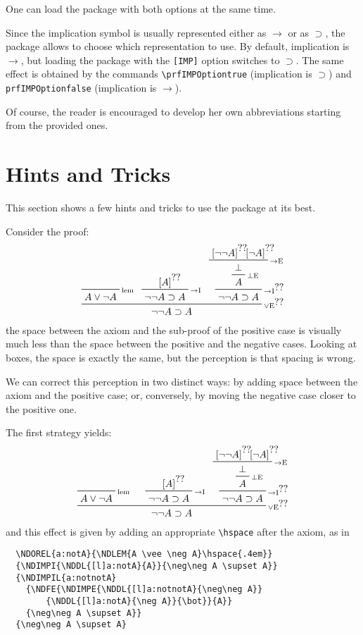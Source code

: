 \documentclass{amsart}
\begin{document}
One can load the package with both options at the same
time.\vspace{2ex}

Since the implication symbol is usually represented either as
$\rightarrow$ or as $\supset$, the package allows to choose which
representation to use. By default, implication is $\rightarrow$, but
loading the package with the \verb|[IMP]| option switches to
$\supset$. The same effect is obtained by the commands
\verb|\prfIMPOptiontrue| (implication is $\supset$) and
\verb|prfIMPOptionfalse| (implication is $\rightarrow$).

Of course, the reader is encouraged to develop her own abbreviations
starting from the provided ones.

\clearpage
\section{Hints and Tricks}\label{sec:hints_and_tricks}
This section shows a few hints and tricks to use the package at its
best.\vspace{2ex}

Consider the proof:
\begin{displaymath}
  \begin{prfenv}
    \NDOREL{a:notA}{\NDLEM{A \vee \neg A}}
    {\NDIMPI{\NDDL{a:notA}{A}}{\neg\neg A \supset A}}
    {\NDIMPIL{a:notnotA}
      {\NDFE{\NDIMPE{\NDDL{a:notnotA}{\neg\neg A}}
          {\NDDL{[l]a:notA}{\neg A}}{\bot}}{A}} 
      {\neg\neg A \supset A}}
    {\neg\neg A \supset A}
  \end{prfenv}
\end{displaymath}
the space between the axiom and the sub-proof of the positive case is
visually much less than the space between the positive and the
negative cases. Looking at boxes, the space is exactly the same, but
the perception is that spacing is wrong.

We can correct this perception in two distinct ways: by adding space
between the axiom and the positive case; or, conversely, by moving the
negative case closer to the positive one.

The first strategy yields:
\begin{displaymath}
  \begin{prfenv}
    \NDOREL{a:notA}{\NDLEM{A \vee \neg A}\hspace{.8em}}
    {\NDIMPI{\NDDL{[l]a:notA}{A}}{\neg\neg A \supset A}}
    {\NDIMPIL{a:notnotA}
      {\NDFE{\NDIMPE{\NDDL{[l]a:notnotA}{\neg\neg A}}
          {\NDDL{[l]a:notA}{\neg A}}{\bot}}{A}} 
      {\neg\neg A \supset A}}
    {\neg\neg A \supset A}
  \end{prfenv}
\end{displaymath}
and this effect is given by adding an appropriate \verb|\hspace| after
the axiom, as in
\begin{verbatim}
  \NDOREL{a:notA}{\NDLEM{A \vee \neg A}\hspace{.4em}}
  {\NDIMPI{\NDDL{[l]a:notA}{A}}{\neg\neg A \supset A}}
  {\NDIMPIL{a:notnotA}
    {\NDFE{\NDIMPE{\NDDL{[l]a:notnotA}{\neg\neg A}}
        {\NDDL{[l]a:notA}{\neg A}}{\bot}}{A}} 
    {\neg\neg A \supset A}}
  {\neg\neg A \supset A}
\end{verbatim}
\end{document}
